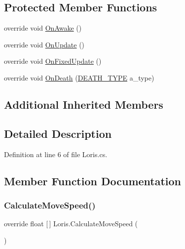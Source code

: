 \subsection*{Protected Member Functions}
\begin{DoxyCompactItemize}
\item 
override void \mbox{\hyperlink{class_loris_abf831310421343c4685d7fb6844c522b}{On\+Awake}} ()
\item 
override void \mbox{\hyperlink{class_loris_a398638e87e93178426ab5a0486a564f7}{On\+Update}} ()
\item 
override void \mbox{\hyperlink{class_loris_a2a3cedda95b895253c1ae39844680351}{On\+Fixed\+Update}} ()
\item 
override void \mbox{\hyperlink{class_loris_a9edf28bf01dbd817175b366f471a4dda}{On\+Death}} (\mbox{\hyperlink{_animal_8cs_aa09ea87b75a706096f010aef7b9b1826}{D\+E\+A\+T\+H\+\_\+\+T\+Y\+PE}} a\+\_\+type)
\end{DoxyCompactItemize}
\subsection*{Additional Inherited Members}


\subsection{Detailed Description}


Definition at line 6 of file Loris.\+cs.



\subsection{Member Function Documentation}
\mbox{\label{class_loris_a5356c9fe0717f3c6fe10be650cbe3c48}} 
\subsubsection{\texorpdfstring{Calculate\+Move\+Speed()}{CalculateMoveSpeed()}}
{\footnotesize\ttfamily override float \mbox{[}$\,$\mbox{]} Loris.\+Calculate\+Move\+Speed (\begin{DoxyParamCaption}{ }\end{DoxyParamCaption})\hspace{0.3cm}{\ttfamily [virtual]}}



